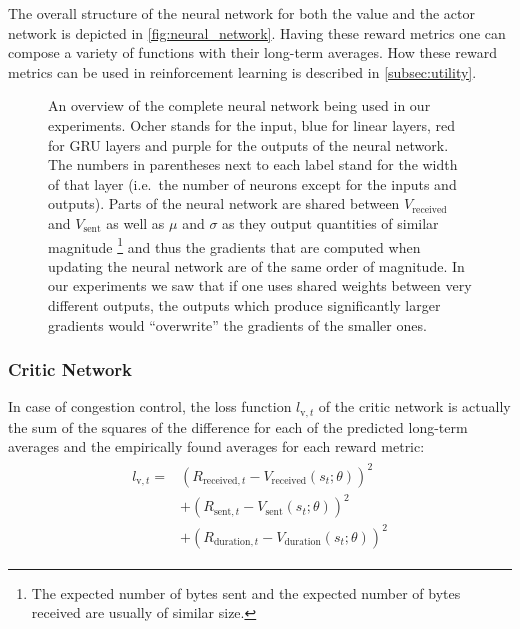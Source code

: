 \documentclass[newfonts=false,format=sigconf,10pt,letterpaper]{acmart}
\begin{document}
The overall structure of the neural network for both the value and the actor network is depicted in \autoref{fig:neural_network}. Having these reward metrics one can compose a variety of functions with their long-term averages. How these reward metrics can be used in reinforcement learning is described in \autoref{subsec:utility}. 

\begin{figure}
\begin{minipage}{\columnwidth}



\caption{An overview of the complete neural network being used in our experiments. Ocher stands for the input, blue for linear layers, red for GRU layers and purple for the outputs of the neural network. The numbers in parentheses next to each label stand for the width of that layer (i.e.~the number of neurons except for the inputs and outputs). Parts of the neural network are shared between $V_\text{received}$ and $V_\text{sent}$ as well as $\mu$ and $\sigma$ as they output quantities of similar magnitude \protect\footnote{The expected number of bytes sent and the expected number of bytes received are usually of similar size.} and thus the gradients that are computed when updating the neural network are of the same order of magnitude. In our experiments we saw that if one uses shared weights between very different outputs, the outputs which produce significantly larger gradients would ``overwrite'' the gradients of the smaller ones.}
\label{fig:neural_network}
\end{minipage}
\end{figure}

\subsubsection{Critic Network}
\label{subsubsec:critic}

In case of congestion control, the loss function $l_{\text{v},t}$ of the critic network is actually the sum of the squares of the difference for each of the predicted long-term averages and the empirically found averages for each reward metric:
\begin{align}
\begin{split}
l_{\text{v},t} =& \left(R_{\text{received},t} - V_\text{received}(s_t; \theta)\right)^2 \\
&+\left(R_{\text{sent},t} - V_\text{sent}(s_t; \theta)\right)^2 \\
&+\left(R_{\text{duration},t} - V_\text{duration}(s_t; \theta)\right)^2
\end{split}
\end{align}
\end{document}
